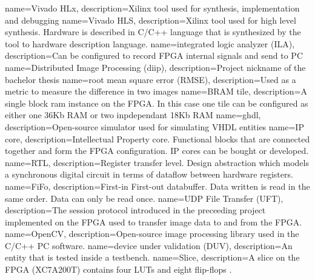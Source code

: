 %
%
{
    name=Vivado HLx,
    description={Xilinx tool used for synthesis, implementation and debugging}
}
{
    name=Vivado HLS,
    description={Xilinx tool used for high level synthesis. Hardware is
    described in C/C++ language that is synthesized by the tool to hardware
    description language.}
}
{
    name=integrated logic analyzer (ILA),
    description={Can be configured to record FPGA internal signals and send to PC}
}
{
    name=Distributed Image Processing (diip),
    description={Project nickname of the bachelor thesis}
}
{
    name=root mean square error (RMSE),
    description={Used as a metric to measure the difference in two images}
}
{
    name=BRAM tile,
    description={A single block ram instance on the FPGA. In this case one tile
    can be configured as either one 36Kb RAM or two inpdependant 18Kb RAM}
}
{
    name=ghdl,
    description={Open-source simulator used for simulating VHDL entities}
}
{
    name=IP core,
    description={Intellectual Property core. Functional blocks that are
    connected together and form the FPGA configuration. IP cores can be bought
    or developed.}
}
{
    name=RTL,
    description={Register transfer level. Design abstraction which models a
    synchronous digital circuit in terms of dataflow between hardware
    registers.}
}
{
    name=FiFo,
    description={First-in First-out databuffer. Data written is read in the
    same order. Data can only be read once.}
}
{
    name=UDP File Transfer (UFT),
    description={The session protocol introduced in the preceeding project
    implemented on
    the FPGA used to transfer image data to and from the FPGA.}
}
{
    name=OpenCV,
    description={Open-source image processing library used in the C/C++ PC
    software.}
}
{
    name=device under validation (DUV),
    description={An entity that is tested inside a testbench.}
}
{
    name=Slice,
    description={A slice on the FPGA (XC7A200T) contains four LUTs and eight flip-flops \cite{ds180}.}
}